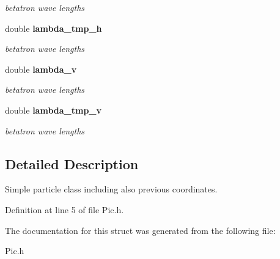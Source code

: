\begin{CompactItemize}
\begin{CompactList}\small\item\em betatron wave lengths\item\end{CompactList}\item 
double {\bf lambda\_\-tmp\_\-h}\label{structParticle_m15}

\begin{CompactList}\small\item\em betatron wave lengths\item\end{CompactList}\item 
double {\bf lambda\_\-v}\label{structParticle_m16}

\begin{CompactList}\small\item\em betatron wave lengths\item\end{CompactList}\item 
double {\bf lambda\_\-tmp\_\-v}\label{structParticle_m17}

\begin{CompactList}\small\item\em betatron wave lengths\item\end{CompactList}\end{CompactItemize}


\subsection{Detailed Description}
Simple particle class including also previous coordinates.



Definition at line 5 of file Pic.h.

The documentation for this struct was generated from the following file:\begin{CompactItemize}
\item 
Pic.h\end{CompactItemize}
